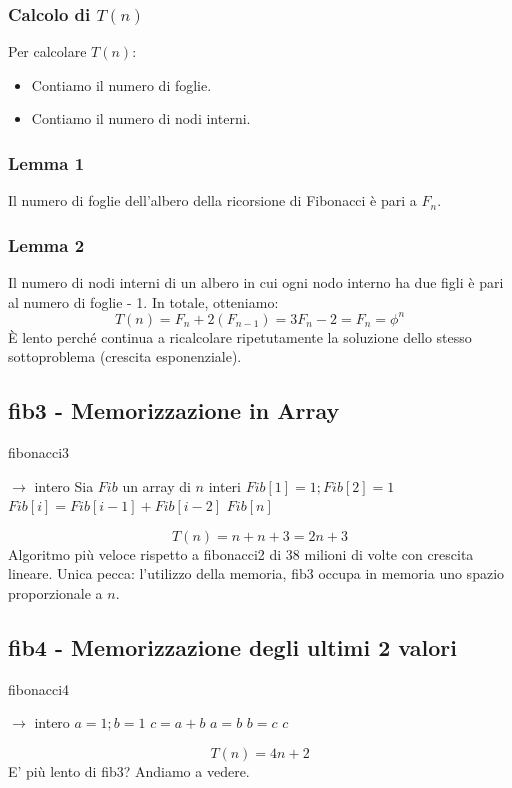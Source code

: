\documentclass{article}
\begin{document}
\subsubsection{Calcolo di $T(n)$}
Per calcolare $T(n)$:
\begin{itemize}
\item Contiamo il numero di foglie.
\item Contiamo il numero di nodi interni.
\end{itemize}

\subsubsection{Lemma 1}
Il numero di foglie dell'albero della ricorsione di Fibonacci è pari a $F_n$.

\subsubsection{Lemma 2}
Il numero di nodi interni di un albero in cui ogni nodo interno ha due figli è pari al numero di foglie - 1.
In totale, otteniamo:
\[T(n) = F_n + 2(F_{n-1}) = 3F_n - 2 = F_n = \phi^n\]
È lento perché continua a ricalcolare ripetutamente la soluzione dello stesso sottoproblema (crescita esponenziale).

\subsection{fib3 - Memorizzazione in Array}
\begin{algorithm}
\caption{fibonacci3}
\begin{algorithmic}[1]
 $\rightarrow$ intero
  \State Sia $Fib$ un array di $n$ interi
  \State $Fib[1] = 1; Fib[2] = 1$
    \State $Fib[i] = Fib[i-1] + Fib[i-2]$
  \EndFor
  \State \Return $Fib[n]$
\EndFunction
\end{algorithmic}
\end{algorithm}
\[T(n) = n + n + 3 = 2n + 3 \]
Algoritmo più veloce rispetto a fibonacci2 di 38 milioni di volte con crescita lineare.
Unica pecca: l'utilizzo della memoria, fib3 occupa in memoria uno spazio proporzionale a $n$.

\subsection{fib4 - Memorizzazione degli ultimi 2 valori}
\begin{algorithm}
\caption{fibonacci4}
\begin{algorithmic}[1]
 $\rightarrow$ intero
  \State $a = 1; b = 1$
    \State $c = a + b$
    \State $a = b$
    \State $b = c$
  \EndFor
  \State \Return $c$
\EndFunction
\end{algorithmic}
\end{algorithm}
\[T(n) = 4n + 2 \]
E' più lento di fib3? Andiamo a vedere.
\end{document}
